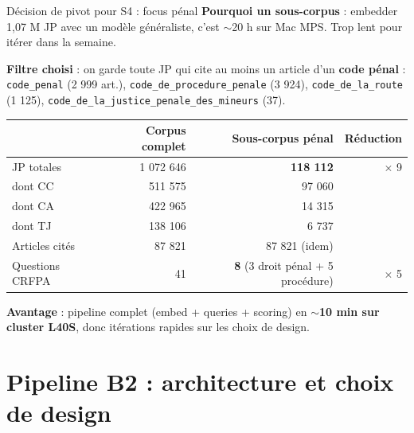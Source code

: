 \documentclass[aspectratio=169,10pt]{beamer}
\newcommand{\keybox}[1]{%
  \begin{center}
  \colorbox{accentsoft}{\parbox{0.92\linewidth}{\centering #1}}
  \end{center}}
\begin{document}
\begin{frame}{Décision de pivot pour S4 : focus pénal}
  \footnotesize
  \textbf{Pourquoi un sous-corpus} : embedder 1,07 M JP avec un modèle généraliste, c'est $\sim$20 h sur Mac MPS. Trop lent pour itérer dans la semaine.

  \vspace{0.4em}
  \textbf{Filtre choisi} : on garde toute JP qui cite au moins un article d'un \textbf{code pénal} :
  \texttt{code\_penal} (2 999 art.), \texttt{code\_de\_procedure\_penale} (3 924), \texttt{code\_de\_la\_route} (1 125), \texttt{code\_de\_la\_justice\_penale\_des\_mineurs} (37).

  \vspace{0.4em}
  \begin{tabular}{@{}l r r r@{}}
    \toprule
    & \textbf{Corpus complet} & \textbf{Sous-corpus pénal} & \textbf{Réduction} \\
    \midrule
    JP totales        & 1 072 646  & \textbf{118 112}  & $\times$ 9 \\
    \quad dont CC     & 511 575    & 97 060            & \\
    \quad dont CA     & 422 965    & 14 315            & \\
    \quad dont TJ     & 138 106    & 6 737             & \\
    Articles cités    & 87 821     & 87 821 (idem)     & \\
    Questions CRFPA   & 41         & \textbf{8} (3 droit pénal + 5 procédure) & $\times$ 5 \\
    \bottomrule
  \end{tabular}

  \vspace{0.5em}
  \keybox{\textbf{Avantage} : pipeline complet (embed + queries + scoring) en \textbf{$\sim$10 min sur cluster L40S}, donc itérations rapides sur les choix de design.}
\end{frame}

\section{Pipeline B2 : architecture et choix de design}
\end{document}
